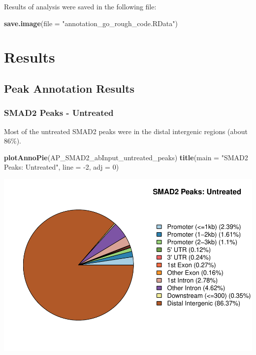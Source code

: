 \documentclass[]{article}
\newenvironment{Shaded}{\begin{snugshade}}{\end{snugshade}}
\newcommand{\DataTypeTok}[1]{\textcolor[rgb]{0.13,0.29,0.53}{#1}}
\newcommand{\DecValTok}[1]{\textcolor[rgb]{0.00,0.00,0.81}{#1}}
\newcommand{\KeywordTok}[1]{\textcolor[rgb]{0.13,0.29,0.53}{\textbf{#1}}}
\newcommand{\NormalTok}[1]{#1}
\newcommand{\StringTok}[1]{\textcolor[rgb]{0.31,0.60,0.02}{#1}}
\begin{document}
Results of analysis were saved in the following file:

\begin{Shaded}
\begin{Highlighting}[]
\KeywordTok{save.image}\NormalTok{(}\DataTypeTok{file =} \StringTok{"annotation_go_rough_code.RData"}\NormalTok{)}
\end{Highlighting}
\end{Shaded}


\section{Results}


\subsection{Peak Annotation Results}


\subsubsection{SMAD2 Peaks - Untreated}

Most of the untreated SMAD2 peaks were in the distal intergenic regions
(about 86\%).

\begin{Shaded}
\begin{Highlighting}[]
\KeywordTok{plotAnnoPie}\NormalTok{(AP_SMAD2_abInput_untreated_peaks)}
\KeywordTok{title}\NormalTok{(}\DataTypeTok{main =} \StringTok{"SMAD2 Peaks: Untreated"}\NormalTok{, }\DataTypeTok{line =} \DecValTok{-2}\NormalTok{, }\DataTypeTok{adj =} \DecValTok{0}\NormalTok{)}
\end{Highlighting}
\end{Shaded}

\includegraphics{peak_annotation_go_term_analysis_files/figure-latex/unnamed-chunk-10-1.pdf}
\end{document}
